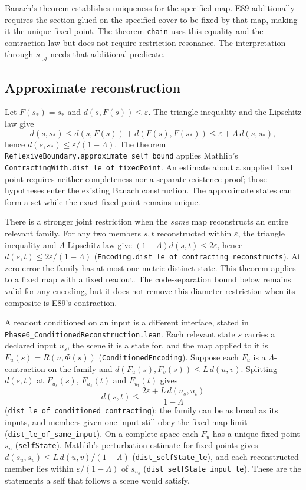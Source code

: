 \documentclass{article}
\begin{document}
Banach's theorem establishes uniqueness for the specified map. E89 additionally requires the section glued on the specified cover to be fixed by that map, making it the unique fixed point. The theorem \texttt{chain} uses this equality and the contraction law but does not require restriction resonance. The interpretation through $s|_{\mathcal{A}}$ needs that additional predicate.

\subsection{Approximate reconstruction}

Let $F(s_*)=s_*$ and $d(s,F(s))\leq\varepsilon$. The triangle inequality and the Lipschitz law give
\[
d(s,s_*)\leq d(s,F(s))+d(F(s),F(s_*))
\leq\varepsilon+\Lambda\,d(s,s_*),
\]
hence $d(s,s_*)\leq\varepsilon/(1-\Lambda)$. The theorem
\nolinkurl{ReflexiveBoundary.approximate_self_bound}
applies Mathlib's \nolinkurl{ContractingWith.dist_le_of_fixedPoint}.
An estimate about a supplied fixed point requires neither completeness nor a separate existence proof; those hypotheses enter the existing Banach construction. The approximate states can form a set while the exact fixed point remains unique.

There is a stronger joint restriction when the \emph{same} map reconstructs an entire relevant family. For any two members $s,t$ reconstructed within $\varepsilon$, the triangle inequality and $\Lambda$-Lipschitz law give $(1-\Lambda)d(s,t)\leq2\varepsilon$, hence $d(s,t)\leq2\varepsilon/(1-\Lambda)$ (\nolinkurl{Encoding.dist_le_of_contracting_reconstructs}). At zero error the family has at most one metric-distinct state. This theorem applies to a fixed map with a fixed readout. The code-separation bound below remains valid for any encoding, but it does not remove this diameter restriction when its composite is E89's contraction.

A readout conditioned on an input is a different interface, stated in \nolinkurl{Phase6_ConditionedReconstruction.lean}. Each relevant state $s$ carries a declared input $u_s$, the scene it is a state for, and the map applied to it is $F_{u}(s)=R(u,\Phi(s))$ (\texttt{ConditionedEncoding}). Suppose each $F_u$ is a $\Lambda$-contraction on the family and $d(F_u(s),F_v(s))\leq L\,d(u,v)$. Splitting $d(s,t)$ at $F_{u_s}(s)$, $F_{u_s}(t)$ and $F_{u_t}(t)$ gives
\[
d(s,t)\leq\frac{2\varepsilon+L\,d(u_s,u_t)}{1-\Lambda}
\]
(\nolinkurl{dist_le_of_conditioned_contracting}): the family can be as broad as its inputs, and members given one input still obey the fixed-map limit (\nolinkurl{dist_le_of_same_input}). On a complete space each $F_u$ has a unique fixed point $s_u$ (\texttt{selfState}). Mathlib's perturbation estimate for fixed points gives $d(s_u,s_v)\leq L\,d(u,v)/(1-\Lambda)$ (\nolinkurl{dist_selfState_le}), and each reconstructed member lies within $\varepsilon/(1-\Lambda)$ of $s_{u_s}$ (\nolinkurl{dist_selfState_input_le}). These are the statements a self that follows a scene would satisfy.
\end{document}
